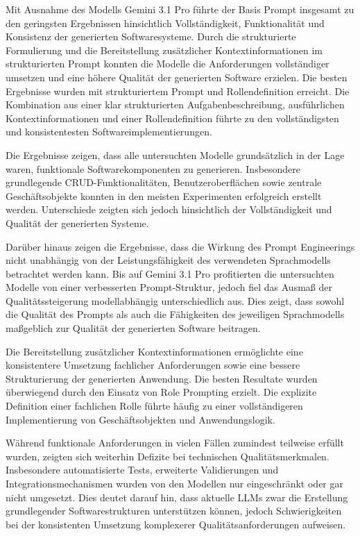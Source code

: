 Mit Ausnahme des Modells Gemini 3.1 Pro führte der Basis Prompt insgesamt zu den geringsten Ergebnissen hinsichtlich Vollständigkeit, Funktionalität und Konsistenz der generierten Softwaresysteme. Durch die strukturierte Formulierung und die Bereitstellung zusätzlicher Kontextinformationen im strukturierten Prompt konnten die Modelle die Anforderungen vollständiger umsetzen und eine höhere Qualität der generierten Software erzielen. Die besten Ergebnisse wurden mit strukturiertem Prompt und Rollendefinition erreicht. Die Kombination aus einer klar strukturierten Aufgabenbeschreibung, ausführlichen Kontextinformationen und einer Rollendefinition führte zu den vollständigsten und konsistentesten Softwareimplementierungen.

Die Ergebnisse zeigen, dass alle untersuchten Modelle grundsätzlich in der Lage waren, funktionale Softwarekomponenten zu generieren. Insbesondere grundlegende CRUD-Funktionalitäten, Benutzeroberflächen sowie zentrale Geschäftsobjekte konnten in den meisten Experimenten erfolgreich erstellt werden. Unterschiede zeigten sich jedoch hinsichtlich der Vollständigkeit und Qualität der generierten Systeme.

Darüber hinaus zeigen die Ergebnisse, dass die Wirkung des Prompt Engineerings nicht unabhängig von der Leistungsfähigkeit des verwendeten Sprachmodells betrachtet werden kann. Bis auf Gemini 3.1 Pro profitierten die untersuchten Modelle von einer verbesserten Prompt-Struktur, jedoch fiel das Ausmaß der Qualitätssteigerung modellabhängig unterschiedlich aus. Dies zeigt, dass sowohl die Qualität des Prompts als auch die Fähigkeiten des jeweiligen Sprachmodells maßgeblich zur Qualität der generierten Software beitragen.

Die Bereitstellung zusätzlicher Kontextinformationen ermöglichte eine konsistentere Umsetzung fachlicher Anforderungen sowie eine bessere Strukturierung der generierten Anwendung. Die besten Resultate wurden überwiegend durch den Einsatz von Role Prompting erzielt. Die explizite Definition einer fachlichen Rolle führte häufig zu einer vollständigeren Implementierung von Geschäftsobjekten und Anwendungslogik.

Während funktionale Anforderungen in vielen Fällen zumindest teilweise erfüllt wurden, zeigten sich weiterhin Defizite bei technischen Qualitätsmerkmalen. Insbesondere automatisierte Tests, erweiterte Validierungen und Integrationsmechanismen wurden von den Modellen nur eingeschränkt oder gar nicht umgesetzt. Dies deutet darauf hin, dass aktuelle LLMs zwar die Erstellung grundlegender Softwarestrukturen unterstützen können, jedoch Schwierigkeiten bei der konsistenten Umsetzung komplexerer Qualitätsanforderungen aufweisen.


